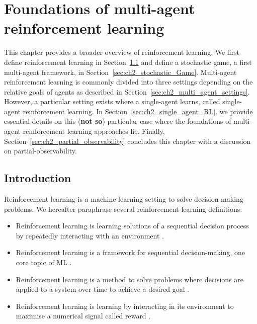 \chapter{Foundations of multi-agent reinforcement learning} \label{ch:background}

\begin{chapter_outline}

This chapter provides a broader overview of reinforcement learning.
We first define reinforcement learning in Section~\ref{sec:ch2_Introduction} and define a stochastic game, a first multi-agent framework, in Section~\ref{sec:ch2_stochastic_Game}.
Multi-agent reinforcement learning is commonly divided into three settings depending on the relative goals of agents as described in Section~\ref{sec:ch2_multi_agent_settings}.
However, a particular setting exists where a single-agent learns, called single-agent reinforcement learning.
In Section~\ref{sec:ch2_single_agent_RL}, we provide essential details on this (\textbf{not so}) particular case where the foundations of multi-agent reinforcement learning approaches lie.
Finally, Section~\ref{sec:ch2_partial_observability} concludes this chapter with a discussion on partial-observability.

\end{chapter_outline}

\section{Introduction} 
\label{sec:ch2_Introduction}
Reinforcement learning is a machine learning setting to solve decision-making problems.
We hereafter paraphrase several reinforcement learning definitions:
\begin{itemize}
\item Reinforcement learning is learning solutions of a sequential decision process by repeatedly interacting with an environment \citep{marl-book}.
\item Reinforcement learning is a framework for sequential decision-making, one core topic of ML \citep{introDeepRL}.
\item Reinforcement learning is a method to solve problems where decisions are applied to a system over time to achieve a desired goal \citep{BusoniuErnstBook}.
\item Reinforcement learning is learning by interacting in its environment to maximise a numerical signal called reward \citep{sutton2018reinforcement}.
\end{itemize}

